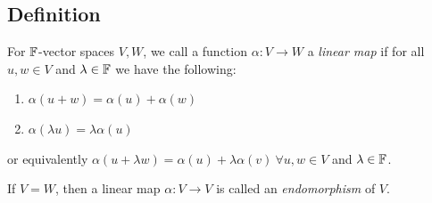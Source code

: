 \documentclass[../main.tex]{subfiles}
\begin{document}
\subsection{Definition}
\begin{definition}
  For $\mathbb{F}$-vector spaces $V, W$, we call a function $\alpha: V \to W$ a \textit{linear map} if for all $u, w \in V$ and $\lambda \in \mathbb{F}$ we have the following:
  \begin{enumerate}
    \item  $\alpha(u + w) = \alpha(u) + \alpha(w)$
    \item $\alpha(\lambda u) = \lambda \alpha(u)$
  \end{enumerate}
  or equivalently $\alpha(u + \lambda w) = \alpha(u) + \lambda \alpha(v)\ \forall u, w \in V$ and $\lambda \in \mathbb{F}$.
\end{definition}
\begin{remark}[Note]
  If $V = W$, then a linear map $\alpha: V \to V$ is called an \textit{endomorphism} of $V$.
\end{remark}
\end{document}
